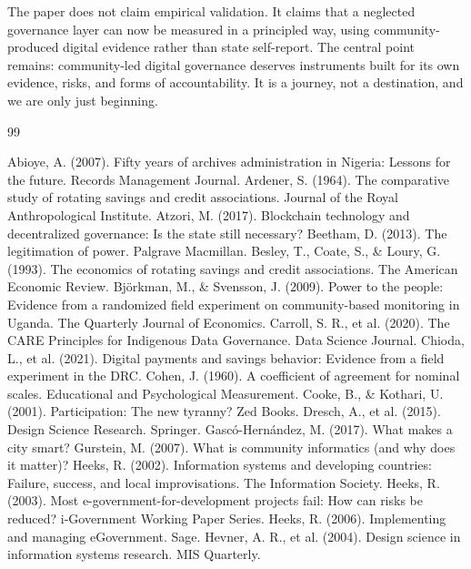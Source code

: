 \documentclass[sigconf]{acmart}
\begin{document}
The paper does not claim empirical validation. It claims that a neglected governance layer can now be measured in a principled way, using community-produced digital evidence rather than state self-report. The central point remains: community-led digital governance deserves instruments built for its own evidence, risks, and forms of accountability. It is a journey, not a destination, and we are only just beginning.

\begin{thebibliography}{99}

 Abioye, A. (2007). Fifty years of archives administration in Nigeria: Lessons for the future. Records Management Journal.
 Ardener, S. (1964). The comparative study of rotating savings and credit associations. Journal of the Royal Anthropological Institute.
 Atzori, M. (2017). Blockchain technology and decentralized governance: Is the state still necessary?
 Beetham, D. (2013). The legitimation of power. Palgrave Macmillan.
 Besley, T., Coate, S., \& Loury, G. (1993). The economics of rotating savings and credit associations. The American Economic Review.
 Björkman, M., \& Svensson, J. (2009). Power to the people: Evidence from a randomized field experiment on community-based monitoring in Uganda. The Quarterly Journal of Economics.
 Carroll, S. R., et al. (2020). The CARE Principles for Indigenous Data Governance. Data Science Journal.
 Chioda, L., et al. (2021). Digital payments and savings behavior: Evidence from a field experiment in the DRC.
 Cohen, J. (1960). A coefficient of agreement for nominal scales. Educational and Psychological Measurement.
 Cooke, B., \& Kothari, U. (2001). Participation: The new tyranny? Zed Books.
 Dresch, A., et al. (2015). Design Science Research. Springer.
 Gascó-Hernández, M. (2017). What makes a city smart?
 Gurstein, M. (2007). What is community informatics (and why does it matter)?
 Heeks, R. (2002). Information systems and developing countries: Failure, success, and local improvisations. The Information Society.
 Heeks, R. (2003). Most e-government-for-development projects fail: How can risks be reduced? i-Government Working Paper Series.
 Heeks, R. (2006). Implementing and managing eGovernment. Sage.
 Hevner, A. R., et al. (2004). Design science in information systems research. MIS Quarterly.

\end{thebibliography}
\end{document}
